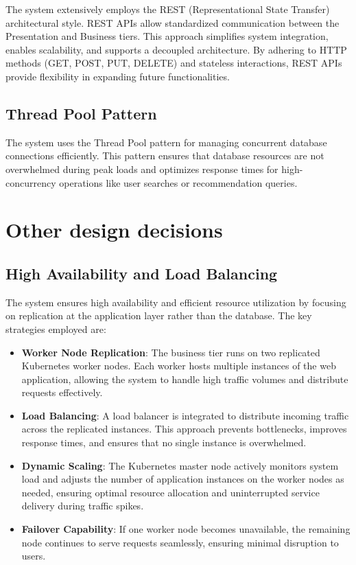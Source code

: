        The system extensively employs the REST (Representational State Transfer) architectural style. REST APIs allow standardized communication between the Presentation and Business tiers. This approach simplifies system integration, enables scalability, and supports a decoupled architecture. By adhering to HTTP methods (GET, POST, PUT, DELETE) and stateless interactions, REST APIs provide flexibility in expanding future functionalities.
        
    \subsection{Thread Pool Pattern}

        The system uses the Thread Pool pattern for managing concurrent database connections efficiently. This pattern ensures that database resources are not overwhelmed during peak loads and optimizes response times for high-concurrency operations like user searches or recommendation queries.


\section{Other design decisions}
    \subsection{High Availability and Load Balancing}

        The system ensures high availability and efficient resource utilization by focusing on replication at the application layer rather than the database. The key strategies employed are:

        \begin{itemize}
            \item \textbf{Worker Node Replication}: The business tier runs on two replicated Kubernetes worker nodes. Each worker hosts multiple instances of the web application, allowing the system to handle high traffic volumes and distribute requests effectively.
            \item \textbf{Load Balancing}: A load balancer is integrated to distribute incoming traffic across the replicated instances. This approach prevents bottlenecks, improves response times, and ensures that no single instance is overwhelmed.
            \item \textbf{Dynamic Scaling}: The Kubernetes master node actively monitors system load and adjusts the number of application instances on the worker nodes as needed, ensuring optimal resource allocation and uninterrupted service delivery during traffic spikes.
            \item \textbf{Failover Capability}: If one worker node becomes unavailable, the remaining node continues to serve requests seamlessly, ensuring minimal disruption to users.
        \end{itemize}


